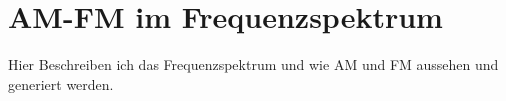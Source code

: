 %
%
%
\section{AM-FM im Frequenzspektrum
\label{fm:section:teil1}}

Hier Beschreiben ich das Frequenzspektrum und wie AM und FM aussehen und generiert werden.
%
%
%
